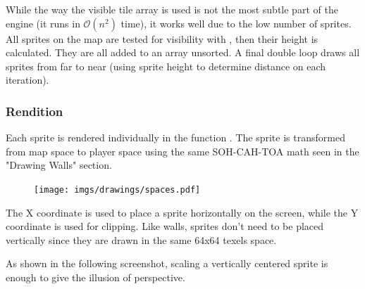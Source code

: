 \par
\begin{minipage}{\textwidth}
 
 \end{minipage}
 \par

While the way the visible tile array is used is not the most subtle part of the engine (it runs in $\mathcal{O}(n^2)$ time), it works well due to the low number of sprites. All sprites on the map are tested for visibility with , then their height is calculated. They are all added to an array unsorted. A final double loop draws all sprites from far to near (using sprite height to determine distance on each iteration).\\ 




\subsubsection{Rendition}
Each sprite is rendered individually in the function . The sprite is transformed from map space to player space using the same SOH-CAH-TOA math seen in the "Drawing Walls" section.

\par
\begin{figure}[H]
\centering
 \texttt{[image: imgs/drawings/spaces.pdf]}
 \end{figure}
\par
The X coordinate is used to place a sprite horizontally on the screen, while the Y coordinate is used for clipping. Like walls, sprites don't need to be placed vertically since they are drawn in the same 64x64 texels space.\\
\par
  \begin{minipage}{.5\textwidth}
  \end{minipage}
   \begin{minipage}{.5\textwidth} 
   \end{minipage}

\par



 As shown in the following screenshot, scaling a vertically centered sprite is enough to give the illusion of perspective.\\
\par
\begin{figure}[H]
 \centering
\end{figure}

